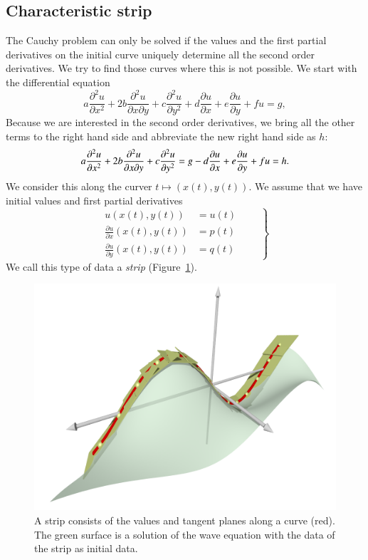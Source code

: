\subsection{Characteristic strip\label{subsection:characteristic-strip}}
The Cauchy problem can only be solved if the values and the
first partial derivatives on the initial curve uniquely determine 
all the second order derivatives.
We try to find those curves where this is not possible.
We start with the differential equation
\begin{equation}
a\frac{\partial^2 u}{\partial x^2}
+
2b\frac{\partial^2 u}{\partial x\partial y}
+
c\frac{\partial^2 u}{\partial y^2}
+
d\frac{\partial u}{\partial x}
+
e\frac{\partial u}{\partial y}
+
fu
=g,
\label{charequation}
\end{equation}
Because we are interested in the second order derivatives,
we bring all the other terms to the right hand side and
abbreviate the new right hand side as $h$:
\begin{equation}
a\frac{\partial^2 u}{\partial x^2}
+
2b\frac{\partial^2 u}{\partial x\partial y}
+
c\frac{\partial^2 u}{\partial y^2}
=
g
-
d\frac{\partial u}{\partial x}
+
e\frac{\partial u}{\partial y}
+
fu
=h.
\notag
\end{equation}
We consider this along the curver
$t\mapsto(x(t),y(t))$.
We assume that we have initial values and first partial derivatives
\begin{equation}
\left.
\begin{aligned}
u(x(t),y(t))&=u(t)\\
\frac{\partial u}{\partial x}(x(t),y(t)) &= p(t)\\
\frac{\partial u}{\partial y}(x(t),y(t)) &= q(t)
\end{aligned}
\qquad
\right\}
\label{charanfangs}
\end{equation}
We call this type of data a {\em strip}
(Figure~\ref{skript:streifen}).

\begin{figure}
\centering
\includegraphics[width=\hsize]{../common/3d/streifen0.png}
\caption{A strip consists of the values and tangent planes
along a curve (red).
The green surface is a solution of the wave equation with the
data of the strip as initial data.
\label{skript:streifen}}
\end{figure}

